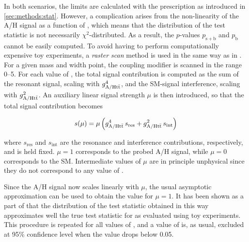 In both scenarios, the limits are calculated with the \CLs prescription as introduced in \cref{sec:methods:stat}. However, a complication arises from the non-linearity of the A/H signal as a function of \gAHtt, which means that the distribution of the test statistic is not necessarily $\chi^2$-distributed. As a result, the $p$-values $p_{\mathrm{s+b}}$ and $p_{\mathrm{b}}$ cannot be easily computed. To avoid having to perform computationally expensive toy experiments, a \textit{raster scan} method is used in the same way as in . For a given \AH mass and width point, the coupling modifier \gAHtt is scanned in the range 0--5. For each value of \gAHtt, the total signal contribution is computed as the sum of the resonant signal, scaling with $g_{\mathrm{A/H t \bar{t}}}^4$, and the SM-signal interference, scaling with $g_{\mathrm{A/H t \bar{t}}}^2$. An auxiliary linear signal strength $\mu$ is then introduced, so that the total signal contribution becomes

\begin{equation}
    s (\mu) = \mu \left( g_{\mathrm{A/H t \bar{t}}}^4 \, s_{\mathrm{res}} + g_{\mathrm{A/H t \bar{t}}}^2 \, s_{\mathrm{int}} \right)
\end{equation}

\noindent where $s_{\mathrm{res}}$ and $s_{\mathrm{int}}$ are the resonance and interference contributions, respectively, and \gAHtt is held fixed. $\mu = 1$ corresponds to the probed A/H signal, while $\mu = 0$ corresponds to the SM. Intermediate values of $\mu$ are in principle unphysical since they do not correspond to any value of \gAHtt.

Since the A/H signal now scales linearly with $\mu$, the usual asymptotic approximation can be used to obtain the \CLs value for $\mu = 1$. It has been shown as a part of  that the distribution of the test statistic obtained in this way approximates well the true test statistic for \gAHtt as evaluated using toy experiments. This procedure is repeated for all values of \gAHtt, and a value of \gAHtt is, as usual, excluded at 95\% confidence level when the \CLs value drops below 0.05. 

